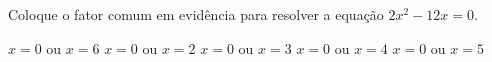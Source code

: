 Coloque o fator comum em evidência para resolver a equação $2x^2-12x=0$.

$x=0$ ou $x=6$
$x=0$ ou $x=2$
$x=0$ ou $x=3$
$x=0$ ou $x=4$
$x=0$ ou $x=5$


